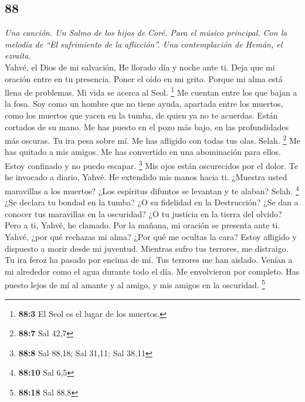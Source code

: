 \begin{paracol}{2}
\hypertarget{section-174}{%
\section{88}\label{section-174}}

\emph{Una canción. Un Salmo de los hijos de Coré. Para el músico
principal. Con la melodía de ``El sufrimiento de la aflicción''. Una
contemplación de Hemán, el ezraíta.}\\
 Yahvé, el Dios de mi salvación, He llorado día y noche
ante ti.  Deja que mi oración entre en tu presencia. Poner
el oído en mi grito.  Porque mi alma está llena de
problemas. Mi vida se acerca al Seol. \footnote{\textbf{88:3} El Seol es
  el lugar de los muertos.}  Me cuentan entre los que
bajan a la fosa. Soy como un hombre que no tiene ayuda, 
apartada entre los muertos, como los muertos que yacen en la tumba, de
quien ya no te acuerdas. Están cortados de su mano.  Me
has puesto en el pozo más bajo, en las profundidades más oscuras.
 Tu ira pesa sobre mí. Me has afligido con todas tus olas.
Selah. \footnote{\textbf{88:7} Sal 42,7}  Me has quitado a
mis amigos. Me has convertido en una abominación para ellos. Estoy
confinado y no puedo escapar. \footnote{\textbf{88:8} Sal 88,18; Sal
  31,11; Sal 38,11}  Mis ojos están oscurecidos por el
dolor. Te he invocado a diario, Yahvé. He extendido mis manos hacia ti.
 ¿Muestra usted maravillas a los muertos? ¿Los espíritus
difuntos se levantan y te alaban? Selah. \footnote{\textbf{88:10} Sal
  6,5}  ¿Se declara tu bondad en la tumba? ¿O su
fidelidad en la Destrucción?  ¿Se dan a conocer tus
maravillas en la oscuridad? ¿O tu justicia en la tierra del olvido?
 Pero a ti, Yahvé, he clamado. Por la mañana, mi oración
se presenta ante ti.  Yahvé, ¿por qué rechazas mi alma?
¿Por qué me ocultas la cara?  Estoy afligido y dispuesto
a morir desde mi juventud. Mientras sufro tus terrores, me distraigo.
 Tu ira feroz ha pasado por encima de mí. Tus terrores me
han aislado.  Venían a mi alrededor como el agua durante
todo el día. Me envolvieron por completo.  Has puesto
lejos de mí al amante y al amigo, y mis amigos en la oscuridad.
\footnote{\textbf{88:18} Sal 88,8}

\switchcolumn
\begin{otherlanguage}{english}


\end{otherlanguage}
\end{paracol}
